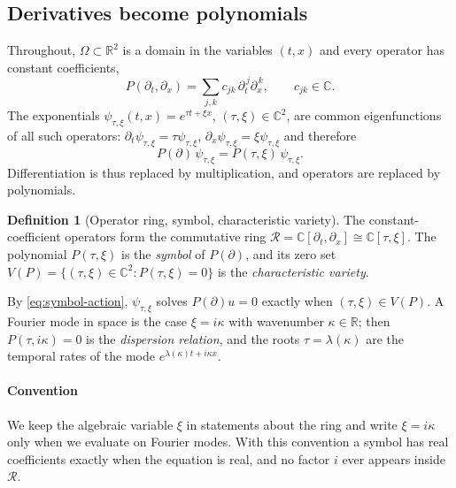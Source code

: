 \documentclass[11pt]{article}
\theoremstyle{plain}
\theoremstyle{definition}
\newtheorem{definition}[theorem]{Definition}
\theoremstyle{remark}
\newcommand{\R}{\mathbb{R}}
\newcommand{\C}{\mathbb{C}}
\newcommand{\ring}{\mathcal{R}}            %
\newcommand{\Var}{V}                        %
\begin{document}


\subsection{Derivatives become polynomials}\label{sec:ring}
Throughout, $\Omega\subset\R^2$ is a domain in the variables $(t,x)$ and every operator has constant
coefficients,
\[
  P(\partial_t,\partial_x)=\sum_{j,k}c_{jk}\,\partial_t^{\,j}\partial_x^{\,k},\qquad c_{jk}\in\C .
\]
The exponentials $\psi_{\tau,\xi}(t,x)=e^{\tau t+\xi x}$, $(\tau,\xi)\in\C^2$, are common eigenfunctions of
all such operators: $\partial_t \psi_{\tau,\xi}=\tau \psi_{\tau,\xi}$, $\partial_x \psi_{\tau,\xi}=\xi \psi_{\tau,\xi}$ and
therefore
\begin{equation}\label{eq:symbol-action}
  P(\partial)\,\psi_{\tau,\xi}=P(\tau,\xi)\,\psi_{\tau,\xi}.
\end{equation}
Differentiation is thus replaced by multiplication, and operators are replaced by polynomials.

\begin{definition}[Operator ring, symbol, characteristic variety]\label{def:ring}
The constant-coefficient operators form the commutative ring
$\ring=\C[\partial_t,\partial_x]\cong\C[\tau,\xi]$. The polynomial $P(\tau,\xi)$ is the \emph{symbol} of
$P(\partial)$, and its zero set $\Var(P)=\{(\tau,\xi)\in\C^2:P(\tau,\xi)=0\}$ is the
\emph{characteristic variety}.
\end{definition}

By \eqref{eq:symbol-action}, $\psi_{\tau,\xi}$ solves $P(\partial)u=0$ exactly when $(\tau,\xi)\in\Var(P)$.
A Fourier mode in space is the case $\xi=i\kappa$ with wavenumber $\kappa\in\R$; then
$P(\tau,i\kappa)=0$ is the \emph{dispersion relation}, and the roots $\tau=\lambda(\kappa)$ are the
temporal rates of the mode $e^{\lambda(\kappa)t+i\kappa x}$.

\paragraph{Convention}
We keep the algebraic variable $\xi$ in statements about the ring and write $\xi=i\kappa$ only when we
evaluate on Fourier modes. With this convention a symbol has real coefficients exactly when the
equation is real, and no factor $i$ ever appears inside $\ring$.
\end{document}
